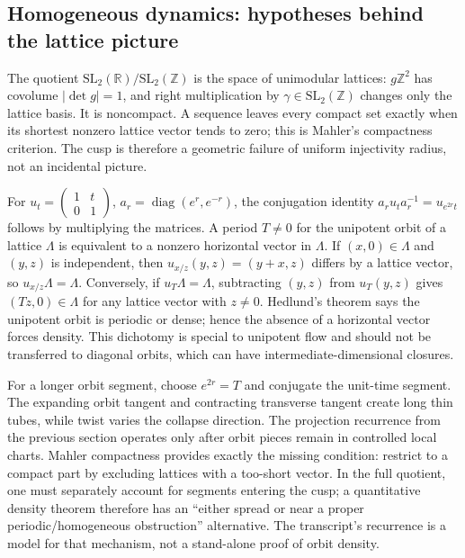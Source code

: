 \subsection{Homogeneous dynamics: hypotheses behind the lattice picture}\label{04-visual-computing-ii-ch033-homogeneous-dynamics-hypotheses-behind-the-lattice-picture}

The quotient \(\mathrm{SL}_2(\mathbb R)/\mathrm{SL}_2(\mathbb Z)\) is the space of unimodular lattices: \(g\mathbb Z^2\) has covolume \(|\det g|=1\), and right multiplication by \(\gamma\in\mathrm{SL}_2(\mathbb Z)\) changes only the lattice basis. It is noncompact. A sequence leaves every compact set exactly when its shortest nonzero lattice vector tends to zero; this is Mahler's compactness criterion. The cusp is therefore a geometric failure of uniform injectivity radius, not an incidental picture.

For \(u_t=\begin{pmatrix}1&t\\0&1\end{pmatrix}\), \(a_r=\operatorname{diag}(e^r,e^{-r})\), the conjugation identity \(a_ru_ta_r^{-1}=u_{e^{2r}t}\) follows by multiplying the matrices. A period \(T\ne0\) for the unipotent orbit of a lattice \(\Lambda\) is equivalent to a nonzero horizontal vector in \(\Lambda\). If \((x,0)\in\Lambda\) and \((y,z)\) is independent, then \(u_{x/z}(y,z)=(y+x,z)\) differs by a lattice vector, so \(u_{x/z}\Lambda=\Lambda\). Conversely, if \(u_T\Lambda=\Lambda\), subtracting \((y,z)\) from \(u_T(y,z)\) gives \((Tz,0)\in\Lambda\) for any lattice vector with \(z\ne0\). Hedlund's theorem says the unipotent orbit is periodic or dense; hence the absence of a horizontal vector forces density. This dichotomy is special to unipotent flow and should not be transferred to diagonal orbits, which can have intermediate-dimensional closures.

For a longer orbit segment, choose \(e^{2r}=T\) and conjugate the unit-time segment. The expanding orbit tangent and contracting transverse tangent create long thin tubes, while twist varies the collapse direction. The projection recurrence from the previous section operates only after orbit pieces remain in controlled local charts. Mahler compactness provides exactly the missing condition: restrict to a compact part by excluding lattices with a too-short vector. In the full quotient, one must separately account for segments entering the cusp; a quantitative density theorem therefore has an ``either spread or near a proper periodic/homogeneous obstruction'' alternative. The transcript's recurrence is a model for that mechanism, not a stand-alone proof of orbit density.

